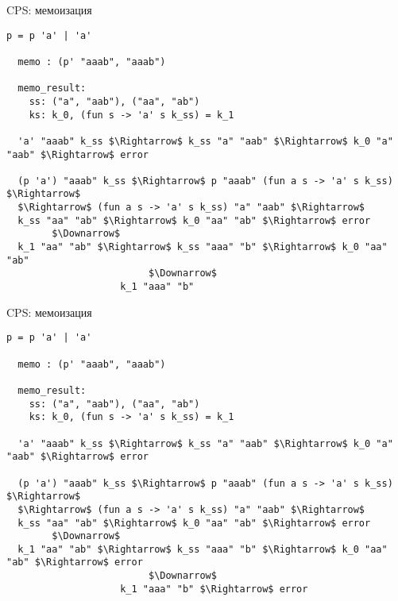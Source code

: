 \documentclass[10pt, mathserif]{beamer}
\theoremstyle{definition}
\begin{document}
\begin{frame}[fragile]{CPS: мемоизация}

\begin{lstlisting}[basicstyle=\small]
  p = p 'a' | 'a'

  memo : (p' "aaab", "aaab")

  memo_result:
    ss: ("a", "aab"), ("aa", "ab")
    ks: k_0, (fun s -> 'a' s k_ss) = k_1

  'a' "aaab" k_ss $\Rightarrow$ k_ss "a" "aab" $\Rightarrow$ k_0 "a" "aab" $\Rightarrow$ error

  (p 'a') "aaab" k_ss $\Rightarrow$ p "aaab" (fun a s -> 'a' s k_ss) $\Rightarrow$
  $\Rightarrow$ (fun a s -> 'a' s k_ss) "a" "aab" $\Rightarrow$
  k_ss "aa" "ab" $\Rightarrow$ k_0 "aa" "ab" $\Rightarrow$ error
        $\Downarrow$
  k_1 "aa" "ab" $\Rightarrow$ k_ss "aaa" "b" $\Rightarrow$ k_0 "aa" "ab"
                         $\Downarrow$
                    k_1 "aaa" "b"
\end{lstlisting}

\end{frame}

\begin{frame}[fragile]{CPS: мемоизация}

\begin{lstlisting}[basicstyle=\small]
  p = p 'a' | 'a'

  memo : (p' "aaab", "aaab")

  memo_result:
    ss: ("a", "aab"), ("aa", "ab")
    ks: k_0, (fun s -> 'a' s k_ss) = k_1

  'a' "aaab" k_ss $\Rightarrow$ k_ss "a" "aab" $\Rightarrow$ k_0 "a" "aab" $\Rightarrow$ error
  
  (p 'a') "aaab" k_ss $\Rightarrow$ p "aaab" (fun a s -> 'a' s k_ss) $\Rightarrow$
  $\Rightarrow$ (fun a s -> 'a' s k_ss) "a" "aab" $\Rightarrow$
  k_ss "aa" "ab" $\Rightarrow$ k_0 "aa" "ab" $\Rightarrow$ error
        $\Downarrow$
  k_1 "aa" "ab" $\Rightarrow$ k_ss "aaa" "b" $\Rightarrow$ k_0 "aa" "ab" $\Rightarrow$ error
                         $\Downarrow$
                    k_1 "aaa" "b" $\Rightarrow$ error
\end{lstlisting}

\end{frame}
\end{document}
